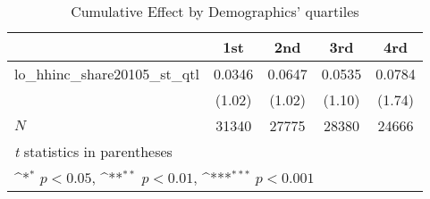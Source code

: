 \begin{table}[htbp]\centering
\def\sym#1{\ifmmode^{#1}\else\(^{#1}\)\fi}
\caption{Cumulative Effect by Demographics' quartiles}
\begin{tabular}{l*{4}{c}}
\hline\hline
            &\multicolumn{1}{c}{1st}&\multicolumn{1}{c}{2nd}&\multicolumn{1}{c}{3rd}&\multicolumn{1}{c}{4rd}\\
\hline
lo\_hhinc\_share20105\_st\_qtl&      0.0346         &      0.0647         &      0.0535         &      0.0784         \\
            &      (1.02)         &      (1.02)         &      (1.10)         &      (1.74)         \\
\hline
\(N\)       &       31340         &       27775         &       28380         &       24666         \\
\hline\hline
\multicolumn{5}{l}{\footnotesize \textit{t} statistics in parentheses}\\
\multicolumn{5}{l}{\footnotesize \sym{*} \(p<0.05\), \sym{**} \(p<0.01\), \sym{***} \(p<0.001\)}\\
\end{tabular}
\end{table}
